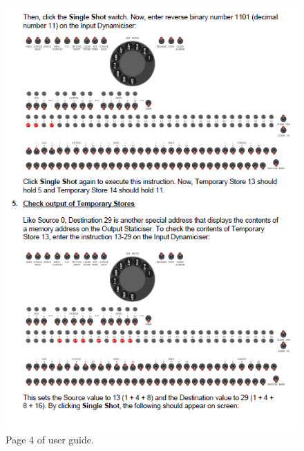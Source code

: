 \documentclass{l4proj}
\begin{document}
\begin{appendices}
\begin{figure}
	\centering
	\includegraphics{images/ug-4}
	\caption{Page 4 of user guide.}
	\label{fig:pg-4}
\end{figure}


\end{appendices}
\end{document}
